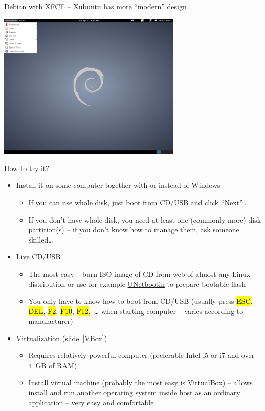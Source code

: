 \documentclass[compress, ucs, xelatex, 11pt, xcolor=svgnames,
  hyperref={
    bookmarks=true,
    unicode=true,
    colorlinks=true,
    pdftitle={Linux, command line and MetaCentrum},
    plainpages=false,
    pdfauthor={Vojtech Zeisek},
    pdfsubject={Course about use of Linux command line, writing shell scripts and using MetaCentrum of CESNET},
    pdfcreator={XeLaTeX},
    pdfkeywords={Linux, GNU, BASH, shell, command line, MetaCentrum},
    linkcolor=DarkRed,
    anchorcolor=DarkBlue,
    citecolor=Indigo,
    filecolor=NavyBlue,
    menucolor=DarkMagenta,
    urlcolor=DarkBlue,
    pdftex},
  url={hyphens, lowtilde} %
  ]{beamer}
\renewcommand{\texttt}[1]{\hl{\ttfamily #1}}
\begin{document}
\begin{frame}{Debian with XFCE -- Xubuntu has more ``modern'' design}
  \begin{center}
    \includegraphics[height=7cm]{debian.png}
  \end{center}
\end{frame}

\begin{frame}{How to try it?}
  \begin{itemize}
    \item Install it on some computer together with or instead of Windows
    \begin{itemize}
      \item If you can use whole disk, just boot from CD/USB and click ``Next''\ldots
      \item If you don't have whole disk, you need at least one (commonly more) disk partition(s) -- if you don't know how to manage them, ask someone skilled\ldots
    \end{itemize}
    \item Live CD/USB
    \begin{itemize}
      \item The most easy -- burn ISO image of CD from web of almost any Linux distribution or use for example \href{https://unetbootin.github.io/}{UNetbootin} to prepare bootable flash
      \item You only have to know how to boot from CD/USB (usually press \texttt{ESC}, \texttt{DEL}, \texttt{F2}, \texttt{F10}, \texttt{F12},~\ldots{ }when starting computer -- varies according to manufacturer)
    \end{itemize}
    \item Virtualization (slide~\ref{VBox})
    \begin{itemize}
      \item Requires relatively powerful computer (preferable Intel i5 or i7 and over 4~GB of RAM)
      \item Install virtual machine (probably the most easy is \href{https://www.virtualbox.org/}{VirtualBox}) -- allows install and run another operating system inside host as an ordinary application -- very easy and comfortable
    \end{itemize}
  \end{itemize}
\end{frame}
\end{document}
